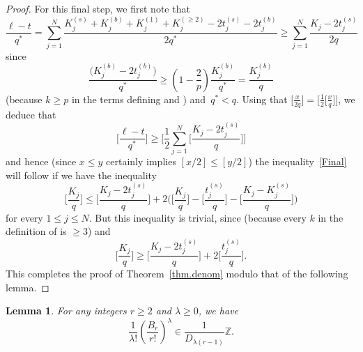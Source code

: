 \documentclass[11pt]{article}
\numberwithin{equation}{section}
\numberwithin{equation}{section}
\newtheorem{Lemma}[Theorem]{Lemma}
\def\l{\lambda}
\def\l{\lambda}
\def\Z{\mathbb Z}
\def\m{ - }
\def\l{\lambda}
\def\be{\begin{equation}}
\def\ee{\end{equation}}
\begin{document}
\begin{proof}
For this final step, we first note that
\[
\frac{\ell-t}{q^*} = \sum_{j=1}^N
\frac{K_j^{(s)}+K_j^{(b)}+K_j^{(1)}+K_j^{(\ge2)}-2t_j^{(s)}-2t_j^{(b)}}{2q^*}
 \ge \sum_{j=1}^N\frac{K_j-2t_j^{(s)}}{2q}
\]
since
\[
\frac{\big(K_j^{(b)}-2t_j^{(b)}\big)}{q^*}\ge \left(1-\frac{2}{p}\right) \frac{K_j^{(b)}}{q^*}=\frac{K_j^{(b)}}{q}
\]
 \big(because $k\ge p$ in the terms defining  and \big) and~$q^*<q$.
Using that $\big[\frac x{2q}\big]=\big[\frac12\big[\frac xq\big]\big]$, we deduce that
\[
\biggl[\frac{\ell-t}{q^*}\biggr] \ge
\Biggl[\frac12\sum_{j=1}^N\Bigg[\frac{K_j-2t_j^{(s)}}{q}\Bigg]\Biggr]
\]
and hence (since $x\le y$ certainly implies $[x/2]\le[y/2]$) the
inequality~\eqref{Final} will follow if we have the inequality
\[
\biggl[\frac{K_j}q\biggr] \le \Bigg[\frac{K_j-2t_j^{(s)}}{q}\Bigg]
+ 2 \Bigg(\biggl[\frac{K_j}q\biggr] \m \Bigg[\frac{t_j^{(s)}}q\Bigg]
\m \Bigg[\frac{K_j-K_j^{(s)}}q\Bigg] \Bigg)
\]
for every $1\le j\le N$. But this inequality is trivial, since
 (because every $k$ in the
definition of  is $\ge3$) and
\[
\biggl[\frac{K_j}q\biggr]\ge\Bigg[\frac{K_j-2t_j^{(s)}}q\Bigg]
+2\Bigg[\frac{t_j^{(s)}}q\Bigg].
\]
 This completes the proof of Theorem~\ref{thm.denom} modulo that of the following lemma.
\end{proof}

\begin{Lemma}\label{LemmaB}
For any integers $r\ge2$ and $\l\ge0$, we have
\be
\label{BernEstimate}
\frac1{\l!} \left(\frac{B_r}{r!}\right)^\l \in \frac1{D_{\l(r-1)}} \Z .
\ee
\end{Lemma}
\end{document}
